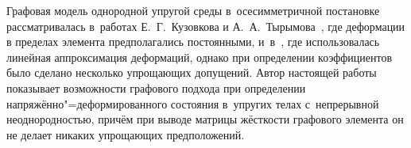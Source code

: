 
\date{28/XII/2010} %



\maketitle


 Графовая модель однородной упругой среды в~осесимметричной постановке рассматривалась в~работах Е.~Г.~Кузовкова и А.~А.~Тырымова~\cite{tyr:bib:1, tyr:bib:2}, где деформации в пределах элемента предполагались постоянными, и~в~\cite{tyr:bib:3}, где использовалась линейная аппроксимация деформаций, однако при определении коэффициентов было сделано несколько упрощающих допущений. Автор настоящей работы показывает возможности графового подхода при определении напряжённо"=деформированного состояния в~упругих телах с~непрерывной неоднородностью, причём при выводе матрицы жёсткости графового элемента он не делает никаких упрощающих предположений.

\smallskip



